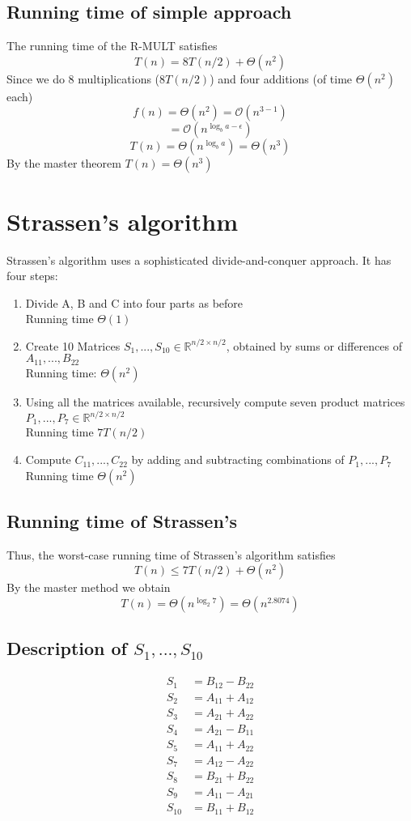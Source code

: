 \documentclass{article}[18pt]
\begin{document}
\subsection{Running time of simple approach}
The running time of the R-MULT satisfies
$$T(n)=8T(n/2)+\Theta(n^2)$$
Since we do 8 multiplications ($8T(n/2)$) and four additions (of time $\Theta(n^2)$ each)
$$f(n)=\Theta(n^2)=\mathcal{O}(n^{3-1})$$
$$=\mathcal{O}(n^{\log_ba-\epsilon})$$
$$T(n)=\Theta(n^{\log_ba})=\Theta(n^3)$$
By the master theorem $T(n)=\Theta(n^3)$
\section{Strassen's algorithm}
Strassen's algorithm uses a sophisticated divide-and-conquer approach. It has four steps:
\begin{enumerate}
	\item Divide A, B and C into four parts as before\\
	Running time $\Theta(1)$
	\item Create 10 Matrices $S_1,...,S_{10}\in \mathbb{R}^{n/2\times n/2}$, obtained by sums or differences of $A_{11},...,B_{22}$\\
	Running time: $\Theta(n^2)$
	\item Using all the matrices available, recursively compute seven product matrices $P_1,...,P_7\in \mathbb{R}^{n/2\times n/2}$\\
	Running time $7T(n/2)$
	\item Compute $C_{11},...,C_{22}$ by adding and subtracting combinations of $P_1,...,P_7$\\
	Running time $\Theta(n^2)$
\end{enumerate}
\subsection{Running time of Strassen's}
Thus, the worst-case running time of Strassen's algorithm satisfies
\[
T(n) \leq 7 T(n / 2)+\Theta\left(n^{2}\right)
\]
By the master method we obtain
\[
T(n)=\Theta\left(n^{\log _{2} 7}\right)=\Theta\left(n^{2.8074}\right)
\]
\subsection{Description of $S_1,...,S_{10}$}
\[
\begin{aligned} S_{1} &=B_{12}-B_{22} \\ S_{2} &=A_{11}+A_{12} \\ S_{3} &=A_{21}+A_{22} \\ S_{4} &=A_{21}-B_{11} \\ S_{5} &=A_{11}+A_{22} \\ S_{7} &=A_{12}-A_{22} \\ S_{8} &=B_{21}+B_{22} \\ S_{9} &=A_{11}-A_{21} \\ S_{10} &=B_{11}+B_{12} \end{aligned}
\]
\end{document}
